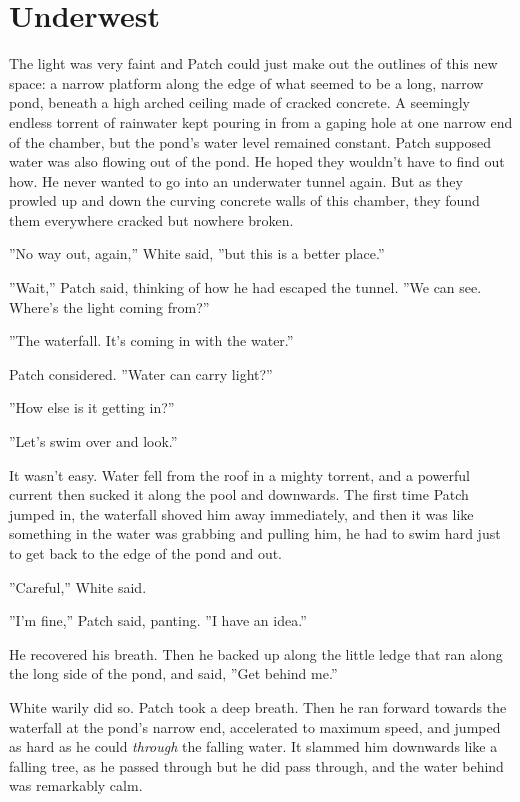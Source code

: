 \documentclass[12pt]{book}
\begin{document}
\section{Underwest}

 The light was very faint and Patch could just make out the outlines of this new space: a narrow platform along the edge of what seemed to be a long, narrow pond, beneath a high arched ceiling made of cracked concrete. A seemingly endless torrent of rainwater kept pouring in from a gaping hole at one narrow end of the chamber, but the pond's water level remained constant. Patch supposed water was also flowing out of the pond. He hoped they wouldn't have to find out how. He never wanted to go into an underwater tunnel again. But as they prowled up and down the curving concrete walls of this chamber, they found them everywhere cracked but nowhere broken.\par
 ''No way out, again,'' White said, ''but this is a better place.''\par
 ''Wait,'' Patch said, thinking of how he had escaped the tunnel. ''We can see. Where's the light coming from?''\par
 ''The waterfall. It's coming in with the water.''\par
 Patch considered. ''Water can carry light?''\par
 ''How else is it getting in?''\par
 ''Let's swim over and look.''\par
 It wasn't easy. Water fell from the roof in a mighty torrent, and a powerful current then sucked it along the pool and downwards. The first time Patch jumped in, the waterfall shoved him away immediately, and then it was like something in the water was grabbing and pulling him, he had to swim hard just to get back to the edge of the pond and out.\par
 ''Careful,'' White said.\par
 ''I'm fine,'' Patch said, panting. ''I have an idea.''\par
 He recovered his breath. Then he backed up along the little ledge that ran along the long side of the pond, and said, ''Get behind me.''\par
 White warily did so. Patch took a deep breath. Then he ran forward towards the waterfall at the pond's narrow end, accelerated to maximum speed, and jumped as hard as he could {\it through }the falling water. It slammed him downwards like a falling tree, as he passed through %
 but he did pass through, and the water behind was remarkably calm.\par
\end{document}
